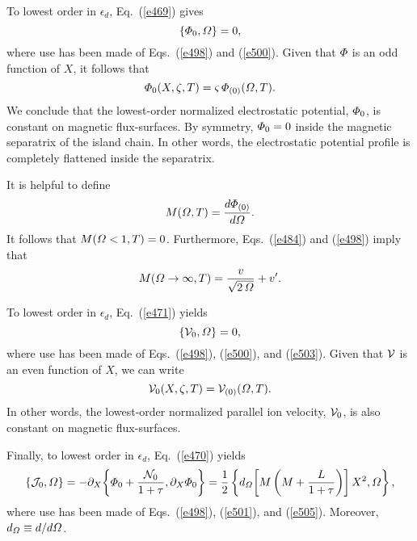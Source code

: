 \documentclass[12pt,prb,aps]{revtex4-1}
\begin{document}
To lowest order in $\epsilon_d$, Eq.~(\ref{e469}) gives
\begin{equation}
\{{\mit\Phi}_0,{\mit\Omega}\}=0,
\end{equation}
where use has been made of Eqs.~(\ref{e498}) and (\ref{e500}). Given that
${\mit\Phi}$ is an odd function of $X$, it follows that 
\begin{equation}\label{e503}
{\mit\Phi}_0(X,\zeta,T) = \varsigma\, {\mit\Phi}_{(0)}({\mit\Omega},T).
\end{equation}
 We conclude that the lowest-order normalized
electrostatic potential, ${\mit\Phi}_{0}$, is  constant on magnetic flux-surfaces. 
By symmetry, ${\mit\Phi}_{0}=0$ inside the magnetic separatrix of the island chain. In other words, the electrostatic
potential profile is  completely flattened inside the separatrix. 

It is helpful to define
\begin{equation}\label{e505}
M({\mit\Omega},T) = \frac{d{\mit\Phi}_{(0)}}{d{\mit\Omega}}.
\end{equation}
It follows that $M({\mit\Omega}<1,T)=0$. Furthermore, Eqs.~(\ref{e484}) and (\ref{e498}) imply that
\begin{equation}\label{e506}
M({\mit\Omega}\rightarrow\infty,T) = \frac{v}{\sqrt{2\,{\mit\Omega}}}+ v'.
\end{equation}

To lowest order in $\epsilon_d$, Eq.~(\ref{e471}) yields
\begin{equation}
\{{\cal V}_0,{\mit\Omega}\} = 0,
\end{equation}
where use has been made of Eqs.~(\ref{e498}), (\ref{e500}), and (\ref{e503}). Given that
${\cal V}$ is an even function of $X$, we can write
\begin{equation}\label{e508}
{\cal V}_0(X,\zeta,T) = {\cal V}_{(0)}({\mit\Omega},T).
\end{equation}
In other words, the lowest-order normalized parallel ion velocity, ${\cal V}_0$, is also constant on
magnetic flux-surfaces. 

Finally, to lowest order in $\epsilon_d$, Eq.~(\ref{e470}) yields
\begin{equation}\label{e509}
\{{\cal J}_0,{\mit\Omega}\} = -\partial_X\!\left\{{\mit\Phi}_0+\frac{{\cal N}_0}{1+\tau}, \partial_X {\mit\Phi}_0\right\}=
\frac{1}{2}\left\{d_{\mit\Omega}\!\left[M\left(M+\frac{L}{1+\tau}\right)\right]X^2, {\mit\Omega}\right\},
\end{equation}
where use has been made of Eqs.~(\ref{e498}), (\ref{e501}), and (\ref{e505}). Moreover, $d_{\mit\Omega}\equiv
d/d{\mit\Omega}$. 
\end{document}
